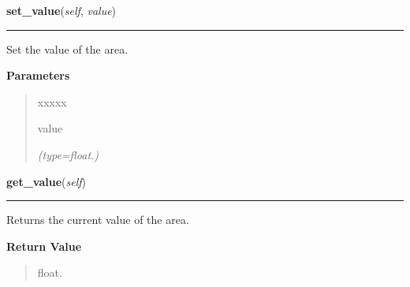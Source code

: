     \label{pygtk_chart:chart:Area:set_value}

    \vspace{0.5ex}

\hspace{.8\funcindent}\begin{boxedminipage}{\funcwidth}

    \raggedright \textbf{set\_value}(\textit{self}, \textit{value})

    \vspace{-1.5ex}

    \rule{\textwidth}{0.5\fboxrule}
\setlength{\parskip}{2ex}
    Set the value of the area.

\setlength{\parskip}{1ex}
      \textbf{Parameters}
      \vspace{-1ex}

      \begin{quote}
        \begin{Ventry}{xxxxx}

          \item[value]

            {\it (type=float.)}

        \end{Ventry}

      \end{quote}

    \end{boxedminipage}

    \label{pygtk_chart:chart:Area:get_value}

    \vspace{0.5ex}

\hspace{.8\funcindent}\begin{boxedminipage}{\funcwidth}

    \raggedright \textbf{get\_value}(\textit{self})

    \vspace{-1.5ex}

    \rule{\textwidth}{0.5\fboxrule}
\setlength{\parskip}{2ex}
    Returns the current value of the area.

\setlength{\parskip}{1ex}
      \textbf{Return Value}
    \vspace{-1ex}

      \begin{quote}
      float.

      \end{quote}

    \end{boxedminipage}

